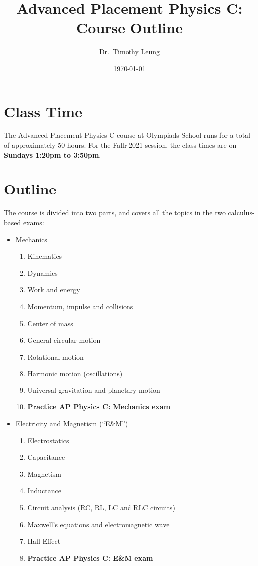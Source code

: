 \documentclass{../oss-handout}
\title{Advanced Placement Physics C: Course Outline}
\author{Dr.\ Timothy Leung}%
\date{\today}
\begin{document}
\thispagestyle{title}
\gentitle

\section*{Class Time}
The Advanced Placement Physics C course at Olympiads School runs for a total of
approximately 50 hours. For the Fallr 2021 session, the class times are on
\textbf{Sundays 1:20pm to 3:50pm}.

\section*{Outline}
The course is divided into two parts, and covers all the topics in the two
calculus-based exams:
\begin{itemize}[nosep,leftmargin=15pt]
\item Mechanics
  \begin{enumerate}[nosep]
  \item Kinematics
  \item Dynamics
  \item Work and energy
  \item Momentum, impulse and collisions
  \item Center of mass
  \item General circular motion
  \item Rotational motion
  \item Harmonic motion (oscillations)
  \item Universal gravitation and planetary motion
  \item\textbf{Practice AP Physics C: Mechanics exam}
  \end{enumerate}
\item Electricity and Magnetism (``E\&M'')
  \begin{enumerate}
  \item Electrostatics
  \item Capacitance
  \item Magnetism
  \item Inductance
  \item Circuit analysis (RC, RL, LC and RLC circuits)
  \item Maxwell's equations and electromagnetic wave
  \item Hall Effect
  \item\textbf{Practice AP Physics C: E\&M exam}
  \end{enumerate}
\end{itemize}
\end{document}
